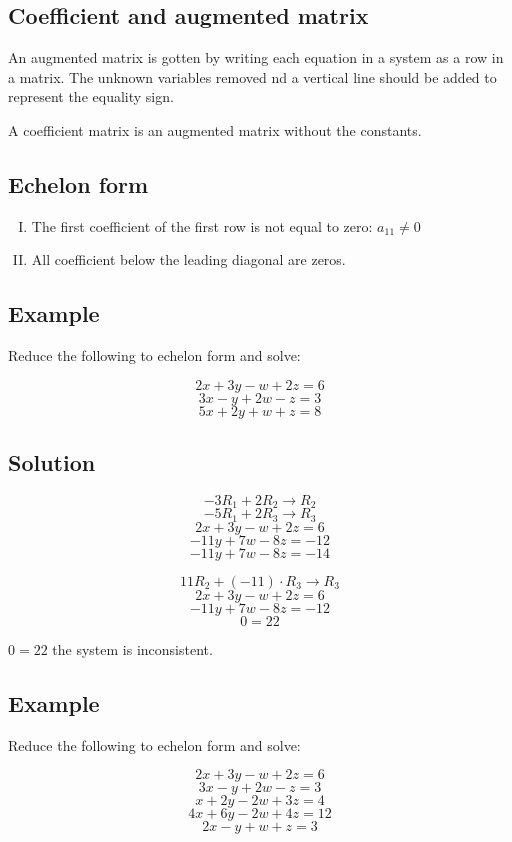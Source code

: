 \documentclass{book}
\begin{document}
\subsection{Coefficient and augmented matrix}

An augmented matrix is gotten by writing each equation in a system as a row in a matrix. The unknown variables removed nd a vertical line should be added to represent the equality sign.

A coefficient matrix is an augmented matrix without the constants.


\subsection{Echelon form}

\begin{enumerate}[I.]
	\item The first coefficient of the first row is not equal to zero: \(a_{11} \ne 0\)
	\item All coefficient below the leading diagonal are zeros.
\end{enumerate}

\subsection{Example}

Reduce the following to echelon form and solve:

\[2x + 3y - w + 2z = 6\]
\[3x - y + 2w - z = 3\]
\[5x + 2y + w + z = 8\]

\subsection*{Solution}

\[-3 R_1 + 2 R_2 \rightarrow R_2\]
\[-5 R_1 + 2 R_3 \rightarrow R_3\]
\[2x + 3y - w + 2z = 6\]
\[-11y + 7w - 8z = -12\]
\[-11y + 7w - 8z = -14\]

\[11 R_2 + (-11) \cdot R_3 \rightarrow R_3\]
\[2x + 3y - w + 2z = 6\]
\[-11y + 7w - 8z = -12\]
\[0 = 22\]

\(0 = 22\) the system is inconsistent.

\subsection{Example}

Reduce the following to echelon form and solve:

\[2x + 3y - w + 2z = 6\]
\[3x - y + 2w - z = 3\]
\[x + 2y - 2w + 3z = 4\]
\[4x + 6y - 2w + 4z = 12\]
\[2x - y + w + z = 3\]
\end{document}
